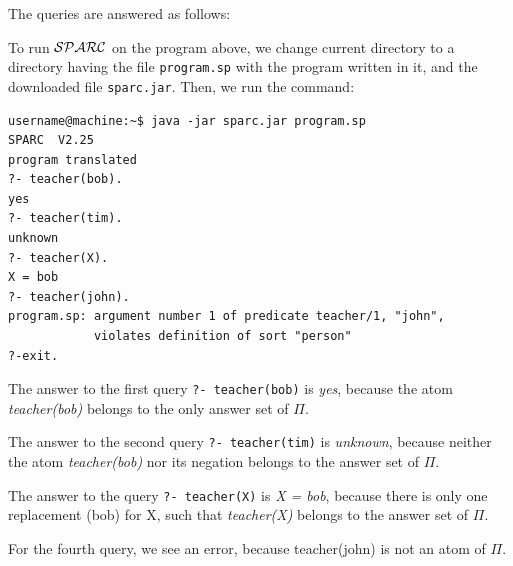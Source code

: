 \documentclass[12pt, letterpaper]{article}
\begin{document}
The queries are answered as follows:

To run  ${\cal SPARC}$  on the program above, 
we change current directory to a directory having the file \texttt{program.sp} with the program written in it, and the downloaded file \texttt{sparc.jar}.  Then, we run the command:
\begin{verbatim}
username@machine:~$ java -jar sparc.jar program.sp
SPARC  V2.25
program translated
?- teacher(bob).
yes
?- teacher(tim).
unknown
?- teacher(X).
X = bob
?- teacher(john).
program.sp: argument number 1 of predicate teacher/1, "john", 
            violates definition of sort "person"
?-exit.
\end{verbatim}

The answer to the first query \texttt{?- teacher(bob)} is \textit{yes}, because the atom \textit{teacher(bob)} belongs to the only answer set of $\Pi$.

The answer to the second query \texttt{?- teacher(tim)} is \textit{unknown}, because neither the atom \textit{teacher(bob)} nor its negation belongs to the answer set of $\Pi$.

The answer to the query \texttt{?- teacher(X)} is \textit{X = bob}, because there is only one replacement (bob) for X, such that \textit{teacher(X)} belongs to the answer set of $\Pi$.

For the fourth query, we see an error, because teacher(john) is not an atom of $\Pi$.
\end{document}
